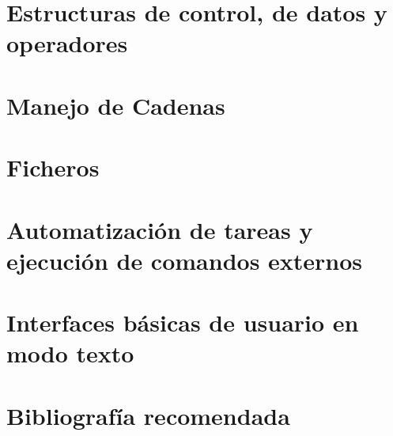 \section{Estructuras de control, de datos y operadores}





\section{Manejo de Cadenas}

\section{Ficheros}

\section{Automatización de tareas y ejecución de comandos externos}

\section{Interfaces básicas de usuario en modo texto}

\section{Bibliografía recomendada}

